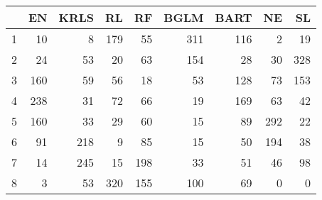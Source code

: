 \begin{table}[ht]
\centering
\begin{tabular}{rrrrrrrrr}
  \hline
 & EN & KRLS & RL & RF & BGLM & BART & NE & SL \\ 
  \hline
1 &  10 &   8 & 179 &  55 & 311 & 116 &   2 &  19 \\ 
  2 &  24 &  53 &  20 &  63 & 154 &  28 &  30 & 328 \\ 
  3 & 160 &  59 &  56 &  18 &  53 & 128 &  73 & 153 \\ 
  4 & 238 &  31 &  72 &  66 &  19 & 169 &  63 &  42 \\ 
  5 & 160 &  33 &  29 &  60 &  15 &  89 & 292 &  22 \\ 
  6 &  91 & 218 &   9 &  85 &  15 &  50 & 194 &  38 \\ 
  7 &  14 & 245 &  15 & 198 &  33 &  51 &  46 &  98 \\ 
  8 &   3 &  53 & 320 & 155 & 100 &  69 &   0 &   0 \\ 
   \hline
\end{tabular}
\end{table}
